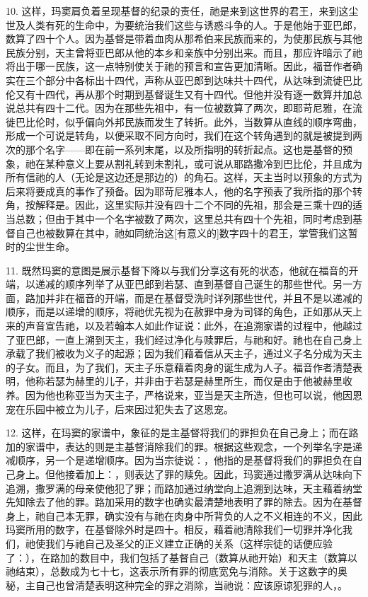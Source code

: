 10. 这样，玛窦肩负着呈现基督的纪录的责任，祂是来到这世界的君王，来到这尘世及人类有死的生命中，为要统治我们这些与诱惑斗争的人。于是他始于亚巴郎，数算了四十个人。因为基督是带着血肉从那希伯来民族而来的，为使那民族与其他民族分别，天主曾将亚巴郎从他的本乡和亲族中分别出来。而且，那应许暗示了祂将出于哪一民族，这一点特别使关于祂的预言和宣告更加清晰。因此，福音作者确实在三个部分中各标出十四代，声称从亚巴郎到达味共十四代，从达味到流徙巴比伦又有十四代，再从那个时期到基督诞生又有十四代。但他并没有逐一数算并加总说总共有四十二代。因为在那些先祖中，有一位被数算了两次，即耶苛尼雅，在流徙巴比伦时，似乎偏向外邦民族而发生了转折。此外，当数算从直线的顺序弯曲，形成一个可说是转角，以便采取不同方向时，我们在这个转角遇到的就是被提到两次的那个名字——即在前一系列末尾，以及所指明的转折起点。这也是基督的预象，祂在某种意义上要从割礼转到未割礼，或可说从耶路撒冷到巴比伦，并且成为所有信祂的人（无论是这边还是那边的）的角石。这样，天主当时以预象的方式为后来将要成真的事作了预备。因为耶苛尼雅本人，他的名字预表了我所指的那个转角，按解释是。因此，这里实际并没有四十二个不同的先祖，那会是三乘十四的适当总数；但由于其中一个名字被数了两次，这里总共有四十个先祖，同时考虑到基督自己也被数算在其中，祂如同统治这[有意义的]数字四十的君王，掌管我们这暂时的尘世生命。\par

11. 既然玛窦的意图是展示基督下降以与我们分享这有死的状态，他就在福音的开端，以递减的顺序列举了从亚巴郎到若瑟、直到基督自己诞生的那些世代。另一方面，路加并非在福音的开端，而是在基督受洗时详列那些世代，并且不是以递减的顺序，而是以递增的顺序，将祂优先视为在赦罪中身为司铎的角色，正如那从天上来的声音宣告祂，以及若翰本人如此作证说：此外，在追溯家谱的过程中，他越过了亚巴郎，一直上溯到天主，我们经过净化与赎罪后，与祂和好。祂也在自己身上承载了我们被收为义子的起源；因为我们藉着信从天主子，通过义子名分成为天主的子女。而且，为了我们，天主子乐意藉着肉身的诞生成为人子。福音作者清楚表明，他称若瑟为赫里的儿子，并非由于若瑟是赫里所生，而仅是由于他被赫里收养。因为他也称亚当为天主子，严格说来，亚当是天主所造，但也可以说，他因恩宠在乐园中被立为儿子，后来因过犯失去了这恩宠。\par

12. 这样，在玛窦的家谱中，象征的是主基督将我们的罪担负在自己身上；而在路加的家谱中，表达的则是主基督消除我们的罪。根据这些观念，一个列举名字是递减顺序，另一个是递增顺序。因为当宗徒说：，他指的是基督将我们的罪担负在自己身上。但他接着加上：，则表达了罪的赎免。因此，玛窦通过撒罗满从达味向下追溯，撒罗满的母亲使他犯了罪；而路加通过纳堂向上追溯到达味，天主藉着纳堂先知除去了他的罪。路加采用的数字也确实最清楚地表明了罪的除去。因为在基督身上，祂自己本无罪，确实没有与祂在肉身中所背负的人之不义相连的不义，因此玛窦所用的数字，在基督除外时是四十。相反，藉着祂清除我们一切罪并净化我们，祂使我们与祂自己及圣父的正义建立正确的关系（这样宗徒的话便应验了：），在路加的数目中，我们包括了基督自己（数算从祂开始）和天主（数算以祂结束），总数成为七十七，这表示所有罪的彻底宽免与消除。关于这数字的奥秘，主自己也曾清楚表明这种完全的罪之消除，当祂说：应该原谅犯罪的人，。\par


